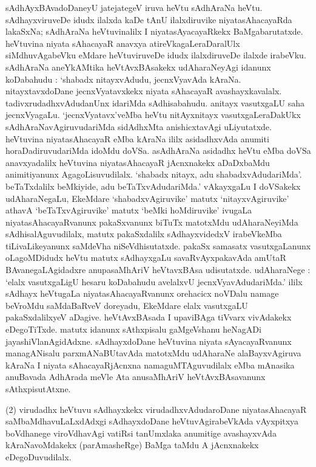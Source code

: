 sAdhAyxBAvadoDaneyU jatejategeV iruva heVtu sAdhAraNa heVtu. sAdhayxviruveDe idudx ilalxda kaDe tAnU ilalxdiruvike niyatasAhacayaRda lakaSxNa; sAdhAraNa heVtuvinalilx I niyatasAyacayaRkekx BaMgabarutatxde. heVtuvina niyata sAhacayaR anavxya atireVka\-gaLeraDaralUlx siMdhuvAgabeVku eMdare heVtuviruveDe idudx ilalxdiruveDe ilalxde irabeVku. sAdhA\-raNa aneYkAMtika heVtAvxBAsakekx udAharaNeyAgi idanunx koDabahudu : `shabadx nitayxvAdudu, jecnxVyavAda kAraNa. nitayxtavxdoDane jecnxVyatavxkekx niyata sAhacayaR avashayxka\-valalx. tadivxrudadhxvAdudanUnx idariMda sAdhisabahudu. anitayx vasutxgaLU saha jecnxVya\-gaLu. `jecnxVyatavx'veMba heVtu nitAyxnitayx vasutxgaLeraDakUkx sAdhAraNavAgiruvudariMda sidAdhxMta anishicxtavAgi uLiyutatxde. heVtuvina niyatasAhacayaR eMba kAraNa ililx asidadhxvAda anumiti horaDadiruvudariMda idoMdu doVSa.  asAdhAraNa asidadhx heVtu eMba doVSa anavxyadalilx heVtuvina niyatasAhacayaR jAcnxnakekx aDaDxbaMdu animitiyanunx AgagoLisuvudilalx. `shabadx nitayx, adu shabadxvAdudariMda'. beTaTxdalilx beMkiyide, adu beTaTxvAdudariMda.' vAkayxgaLu I doVSakekx udAharaNegaLu, EkeMdare `shabadxvAgiruvike' matutx `nitayxvAgiruvike' athavA `beTaTxvAgiruvike' matutx `beMki hoMdiruvike' ivugaLa niyatasAhacayaRvanunx pakaSxvanunx biTuTx matotxMdu udAharaNeyiMda sAdhisalAguvudilalx, matutx pakaSxdalilx sAdhayxvidedxV irabeVkeMba tiLivaLikeyanunx saMdeVha niSeVdhisutatxde.  pakaSx samasatx vasutxgaLanunx oLagoMDidudx heVtu matutx sAdhayxgaLu savaRvAyxpakavAda amUtaR BAvanegaLAgidadxre anupasaMhAriV heVtavxBAsa udisutatxde. udAharaNege : `elalx vasutxgaLigU hesaru koDabahudu avelalxvU jecnxVyavAdudariMda.' ililx sAdhayx heVtugaLa niyatasAhacayaRvanunx orehacicx noVDalu namage beVroMdu saMdaBaRveV doreyadu, EkeMdare elalx vasutxgaLU pakaSxdalilxyeV aDagive. heVtAvxBAsada I upaviBAga tiVvarx vivAdakekx eDegoTiTxde. matutx idanunx sAthxpisalu gaMgeVshanu heNagADi jayashiVlanAgidAdxne. sAdhayxdoDane heVtuvina niyata sAyacayaRvanunx managANisalu parxmANaBUtavAda matotxMdu udAharaNe alaBayxvAgiruva kAraNa I niyata sAhacayaRjAcnxna namaguMTAguvudilalx eMba mAnasika anuBavada AdhArada meVle Ata anusaMhAriV heVtAvxBAsavanunx sAthxpisutAtxne.

(2) virudadhx heVtuvu sAdhayxkekx virudadhxvAdudaroDane niyatasAhacayaR saMbaMdha\-vuLaLxdAdxgi sAdhayxdoDane heVtuvAgirabeVkAda vAyxpitxya boVdhanege viroVdhavAgi vatiRsi tanUmxlaka anumitige avashayxvAda kAraNavoMdakekx (parAmasheRge) BaMga taMdu A jAcnxnakekx eDegoDuvudilalx.

